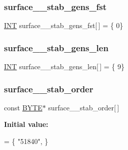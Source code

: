 \subsubsection{\texorpdfstring{surface\+\_\+\_\+stab\+\_\+gens\+\_\+fst}{surface\_4\_stab\_gens\_fst}}
{\footnotesize\ttfamily \mbox{\hyperlink{galois_8h_a09fddde158a3a20bd2dcadb609de11dc}{I\+NT}} surface\+\_\+\_\+stab\+\_\+gens\+\_\+fst\mbox{[}$\,$\mbox{]} = \{ 0\}}

\mbox{\label{surface__4_8_c_aa6fb868a02ede01e35d202f94d28a0aa}} 
\subsubsection{\texorpdfstring{surface\+\_\+\_\+stab\+\_\+gens\+\_\+len}{surface\_4\_stab\_gens\_len}}
{\footnotesize\ttfamily \mbox{\hyperlink{galois_8h_a09fddde158a3a20bd2dcadb609de11dc}{I\+NT}} surface\+\_\+\_\+stab\+\_\+gens\+\_\+len\mbox{[}$\,$\mbox{]} = \{ 9\}}

\mbox{\label{surface__4_8_c_a72a459bc73d39e7aa555ed750173c0bb}} 
\subsubsection{\texorpdfstring{surface\+\_\+\_\+stab\+\_\+order}{surface\_4\_stab\_order}}
{\footnotesize\ttfamily const \mbox{\hyperlink{galois_8h_ab6cc7b4aeb6ea31aba2b3fbfc83ff5e6}{B\+Y\+TE}}$\ast$ surface\+\_\+\_\+stab\+\_\+order\mbox{[}$\,$\mbox{]}}

{\bfseries Initial value\+:}
\begin{DoxyCode}
= \{
    \textcolor{stringliteral}{"51840"},
\}
\end{DoxyCode}
